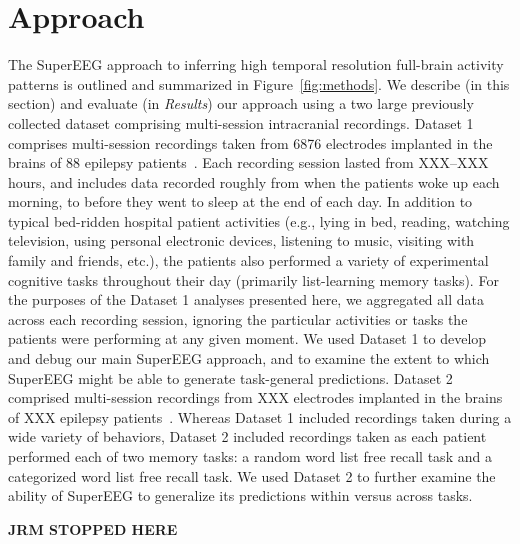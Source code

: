 \documentclass[11pt]{article}
\begin{document}
\section*{Approach}
The SuperEEG approach to inferring high temporal resolution full-brain
activity patterns is outlined and summarized in
Figure~\ref{fig:methods}. We describe (in this section) and evaluate
(in \textit{Results}) our approach using a two large previously
collected dataset comprising multi-session intracranial recordings.
Dataset 1 comprises multi-session recordings taken from 6876
electrodes implanted in the brains of 88 epilepsy
patients~\cite{SedeEtal03, SedeEtal07a, SedeEtal07b, MannEtal11,
  MannEtal12}.  Each recording session lasted from XXX--XXX hours, and
includes data recorded roughly from when the patients woke up each
morning, to before they went to sleep at the end of each day.  In
addition to typical bed-ridden hospital patient activities (e.g.,
lying in bed, reading, watching television, using personal electronic
devices, listening to music, visiting with family and friends, etc.),
the patients also performed a variety of experimental cognitive tasks
throughout their day (primarily list-learning memory tasks).  For the
purposes of the Dataset 1 analyses presented here, we aggregated all
data across each recording session, ignoring the particular activities
or tasks the patients were performing at any given moment.  We used
Dataset 1 to develop and debug our main SuperEEG approach, and to
examine the extent to which SuperEEG might be able to generate
task-general predictions.  Dataset 2 comprised multi-session
recordings from XXX electrodes implanted in the brains of XXX epilepsy
patients~\citep{EzzyEtal17, HoraEtal17, KragEtal17, KuceEtal17,
  LinEtal17, SoloEtal18, WeidEtal18, EzzyEtal18, KuceEtal18}.  Whereas
Dataset 1 included recordings taken during a wide variety of
behaviors, Dataset 2 included recordings taken as each patient
performed each of two memory tasks: a random word list free recall
task and a categorized word list free recall task.  We used Dataset 2
to further examine the ability of SuperEEG to generalize its
predictions within versus across tasks.

\textbf{JRM STOPPED HERE}
\end{document}
